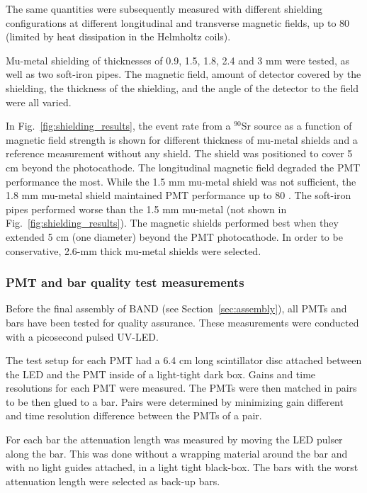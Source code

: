 \documentclass[3p,twocolumn]{elsarticle}
\begin{document}
  The same quantities were subsequently measured with different
  shielding configurations at different longitudinal and transverse
  magnetic fields, up to 80 \si{\gauss} (limited by heat dissipation in the
  Helmholtz coils).

 Mu-metal shielding of thicknesses of 0.9, 1.5, 1.8,
  2.4 and 3 \si{\milli\meter} were tested, as well as two soft-iron pipes. The magnetic field, amount of detector covered by the
  shielding, the thickness of the shielding, and the angle of the detector to the field were
  all varied.
  
In Fig.~\ref{fig:shielding_results}, the event rate from a $^{90}$Sr source as a function of magnetic field strength is shown for different thickness of mu-metal shields and a reference measurement without any shield. The shield was positioned to cover 5 \si{\centi\meter} beyond the photocathode. 
The longitudinal magnetic field degraded the PMT performance
the most.  While the 1.5 \si{\milli\meter} mu-metal shield was not
sufficient, the 1.8 \si{\milli\meter} mu-metal shield maintained PMT
performance up to 80 \si{\gauss}.  The soft-iron pipes performed worse than the
1.5 \si{\milli\meter} mu-metal (not shown in Fig.~\ref{fig:shielding_results}). The magnetic shields performed best when they
extended 5 \si{\centi\meter} (one diameter) beyond the PMT photocathode.  In order to
be conservative, 2.6-mm thick mu-metal shields were selected.




\subsubsection{PMT and bar quality test measurements}
Before the final assembly of BAND (see Section~\ref{sec:assembly}), all PMTs and bars have been tested for quality assurance. These measurements were conducted with a picosecond pulsed UV-LED.

The test setup for each PMT had a 6.4 \si{\centi\meter} long scintillator disc attached between the LED and the PMT inside of a light-tight dark box. Gains and time resolutions for each PMT were measured. The PMTs were then matched in pairs to be then glued to a bar. Pairs were determined by minimizing gain different and time resolution difference between the PMTs of a pair.

For each bar the attenuation length was measured by moving the LED pulser along the bar. This was done without a wrapping material around the bar and with no light guides attached, in a light tight black-box. The bars with the worst attenuation length were selected as back-up bars.
\end{document}
